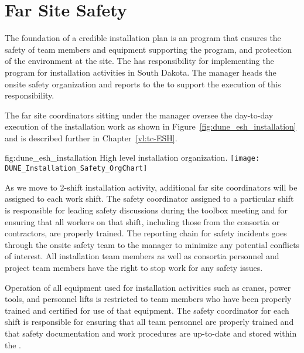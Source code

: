 \section{Far Site Safety}
\label{sec:far_site_safety}

The foundation of a credible installation plan is an 
program that ensures the safety of team members and
equipment supporting the program, and protection of the environment at
the  site.  The  has responsibility for
implementing the   program for 
installation activities in South Dakota.  The 
 manager heads the onsite safety organization and reports
to the  to support the execution of this
responsibility.

The far site  coordinators sitting under the
  manager oversee the day-to-day execution
of the installation work as shown in
Figure~\ref{fig:dune_esh_installation} and is described further in
Chapter~\ref{vl:tc-ESH}.
\begin{dunefigure}{fig:dune_esh_installation}
  {High level  installation  organization.}
  \texttt{[image: DUNE\_Installation\_Safety\_OrgChart]}
\end{dunefigure}
As we move to 2-shift installation activity,
additional far site  coordinators will be assigned to each
work shift.  The safety coordinator assigned
to a particular shift is responsible for leading safety
discussions during the toolbox meeting and for
ensuring that all workers on that shift, including those from the
consortia or contractors, are properly trained.  The reporting chain for safety
incidents goes through the onsite safety team to the
  manager to minimize any potential
conflicts of interest.  All  installation team members as
well as  consortia personnel and  project team
members have the right to stop work for any safety issues.

Operation of all equipment used for installation activities such as
cranes, power tools, and personnel lifts is restricted to team members
who have been properly trained and certified for use of that
equipment.  The safety coordinator for each shift is responsible for
ensuring that all team personnel are properly trained and that safety
documentation and work procedures are up-to-date and stored within the
.

